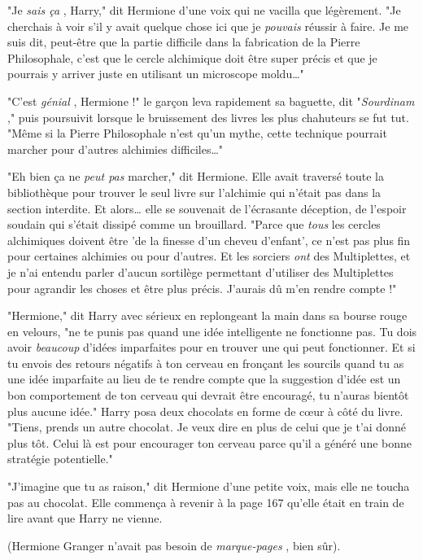 "Je \emph{sais ça} , Harry," dit Hermione d'une voix qui ne vacilla que légèrement. "Je cherchais à voir s'il y avait quelque chose ici que je \emph{pouvais}  réussir à faire. Je me suis dit, peut-être que la partie difficile dans la fabrication de la Pierre Philosophale, c'est que le cercle alchimique doit être super précis et que je pourrais y arriver juste en utilisant un microscope moldu…"

"C'est \emph{génial} , Hermione !" le garçon leva rapidement sa baguette, dit "\emph{Sourdinam} ," puis poursuivit lorsque le bruissement des livres les plus chahuteurs se fut tut. "Même si la Pierre Philosophale n'est qu'un mythe, cette technique pourrait marcher pour d'autres alchimies difficiles…"

"Eh bien ça ne \emph{peut pas}  marcher," dit Hermione. Elle avait traversé toute la bibliothèque pour trouver le seul livre sur l'alchimie qui n'était pas dans la section interdite. Et alors… elle se souvenait de l'écrasante déception, de l'espoir soudain qui s'était dissipé comme un brouillard. "Parce que \emph{tous}  les cercles alchimiques doivent être 'de la finesse d'un cheveu d'enfant', ce n'est pas plus fin pour certaines alchimies ou pour d'autres. Et les sorciers \emph{ont}  des Multiplettes, et je n'ai entendu parler d'aucun sortilège permettant d'utiliser des Multiplettes pour agrandir les choses et être plus précis. J'aurais dû m'en rendre compte !"

"Hermione," dit Harry avec sérieux en replongeant la main dans sa bourse rouge en velours, "ne te punis pas quand une idée intelligente ne fonctionne pas. Tu dois avoir \emph{beaucoup}  d'idées imparfaites pour en trouver une qui peut fonctionner. Et si tu envois des retours négatifs à ton cerveau en fronçant les sourcils quand tu as une idée imparfaite au lieu de te rendre compte que la suggestion d'idée est un bon comportement de ton cerveau qui devrait être encouragé, tu n'auras bientôt plus aucune idée." Harry posa deux chocolats en forme de cœur à côté du livre. "Tiens, prends un autre chocolat. Je veux dire en plus de celui que je t'ai donné plus tôt. Celui là est pour encourager ton cerveau parce qu'il a généré une bonne stratégie potentielle."

"J'imagine que tu as raison," dit Hermione d'une petite voix, mais elle ne toucha pas au chocolat. Elle commença à revenir à la page 167 qu'elle était en train de lire avant que Harry ne vienne.

(Hermione Granger n'avait pas besoin de \emph{marque-pages} , bien sûr).

